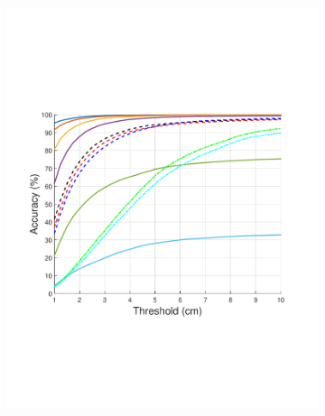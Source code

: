 \begin{figure}[t]
\begin{subfigure}{0.245\textwidth}
		\includegraphics[trim=40 180 60 		170,clip,width=\textwidth]{figures/0822_quant_noLegend/PCK-Threshold-five-people.pdf}
	\end{subfigure}
	\begin{subfigure}{0.245\textwidth}


\end{subfigure}
\end{figure}
